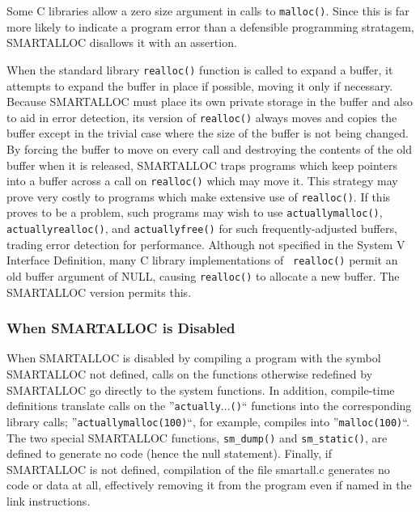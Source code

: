 Some C libraries allow a zero size argument in calls to {\tt malloc()}. Since
this is far more likely to indicate a program error than a defensible
programming stratagem, SMARTALLOC disallows it with an assertion. 

When the standard library {\tt realloc()} function is called to expand a
buffer, it attempts to expand the buffer in place if possible, moving it only
if necessary. Because SMARTALLOC must place its own private storage in the
buffer and also to aid in error detection, its version of {\tt realloc()}
always moves and copies the buffer except in the trivial case where the size
of the buffer is not being changed. By forcing the buffer to move on every
call and destroying the contents of the old buffer when it is released,
SMARTALLOC traps programs which keep pointers into a buffer across a call on
{\tt realloc()} which may move it. This strategy may prove very costly to
programs which make extensive use of {\tt realloc()}. If this proves to be a
problem, such programs may wish to use {\tt actuallymalloc()}, {\tt
actuallyrealloc()}, and {\tt actuallyfree()} for such frequently-adjusted
buffers, trading error detection for performance. Although not specified in
the System V Interface Definition, many C library implementations of {\tt
realloc()} permit an old buffer argument of NULL, causing {\tt realloc()} to
allocate a new buffer. The SMARTALLOC version permits this. 

\subsubsection*{ When SMARTALLOC is Disabled}

When SMARTALLOC is disabled by compiling a program with the symbol SMARTALLOC
not defined, calls on the functions otherwise redefined by SMARTALLOC go
directly to the system functions. In addition, compile-time definitions
translate calls on the ''{\tt actually}...{\tt ()}`` functions into the
corresponding library calls; ''{\tt actuallymalloc(100)}``, for example,
compiles into ''{\tt malloc(100)}``. The two special SMARTALLOC functions,
{\tt sm\_dump()} and {\tt sm\_static()}, are defined to generate no code
(hence the null statement). Finally, if SMARTALLOC is not defined, compilation
of the file smartall.c generates no code or data at all, effectively removing
it from the program even if named in the link instructions. 

